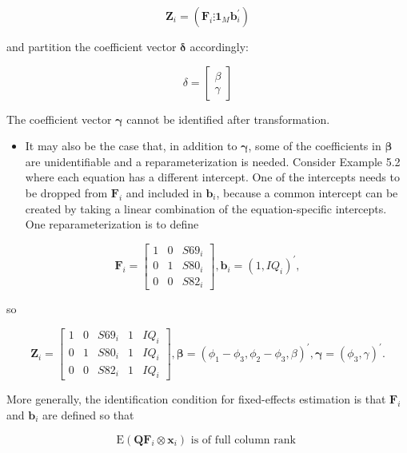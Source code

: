 \documentclass[10pt]{article}
\begin{document}
\begin{equation*}
\mathbf{Z}_{i}=\left(\mathbf{F}_{i} \vdots \mathbf{1}_{M} \mathbf{b}_{i}^{\prime}\right) \tag{5.1.12}
\end{equation*}


and partition the coefficient vector $\boldsymbol{\delta}$ accordingly:

$$
\delta=\left[\begin{array}{l}
\beta \\
\gamma
\end{array}\right]
$$

The coefficient vector $\boldsymbol{\gamma}$ cannot be identified after transformation.

\begin{itemize}
  \item It may also be the case that, in addition to $\boldsymbol{\gamma}$, some of the coefficients in $\boldsymbol{\beta}$ are unidentifiable and a reparameterization is needed. Consider Example 5.2 where each equation has a different intercept. One of the intercepts needs to be dropped from $\mathbf{F}_{i}$ and included in $\mathbf{b}_{i}$, because a common intercept can be created by taking a linear combination of the equation-specific intercepts. One reparameterization is to define
\end{itemize}

\[
\mathbf{F}_{i}=\left[\begin{array}{ccc}
1 & 0 & S 69_{i}  \tag{5.1.13}\\
0 & 1 & S 80_{i} \\
0 & 0 & S 82_{i}
\end{array}\right], \mathbf{b}_{i}=\left(1, I Q_{i}\right)^{\prime},
\]

so

\[
\mathbf{Z}_{i}=\left[\begin{array}{ccccc}
1 & 0 & S 69_{i} & 1 & I Q_{i}  \tag{5.1.14}\\
0 & 1 & S 80_{i} & 1 & I Q_{i} \\
0 & 0 & S 82_{i} & 1 & I Q_{i}
\end{array}\right], \boldsymbol{\beta}=\left(\phi_{1}-\phi_{3}, \phi_{2}-\phi_{3}, \beta\right)^{\prime}, \boldsymbol{\gamma}=\left(\phi_{3}, \gamma\right)^{\prime} .
\]

More generally, the identification condition for fixed-effects estimation is that $\mathbf{F}_{i}$ and $\mathbf{b}_{i}$ are defined so that


\begin{equation*}
\mathrm{E}\left(\mathbf{Q} \mathbf{F}_{i} \otimes \mathbf{x}_{i}\right) \text { is of full column rank } \tag{5.1.15}
\end{equation*}
\end{document}
